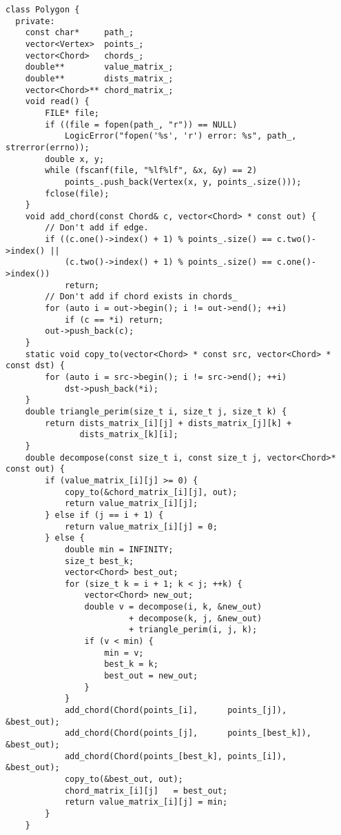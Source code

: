 \documentclass{article}%
\begin{document}
\begin{verbatim}
class Polygon {
  private:
    const char*     path_;
    vector<Vertex>  points_;
    vector<Chord>   chords_;
    double**        value_matrix_;
    double**        dists_matrix_;
    vector<Chord>** chord_matrix_;
    void read() {
        FILE* file;
        if ((file = fopen(path_, "r")) == NULL)
            LogicError("fopen('%s', 'r') error: %s", path_, strerror(errno));
        double x, y;
        while (fscanf(file, "%lf%lf", &x, &y) == 2)
            points_.push_back(Vertex(x, y, points_.size()));
        fclose(file);
    }
    void add_chord(const Chord& c, vector<Chord> * const out) {
        // Don't add if edge.
        if ((c.one()->index() + 1) % points_.size() == c.two()->index() ||
            (c.two()->index() + 1) % points_.size() == c.one()->index())
            return;
        // Don't add if chord exists in chords_
        for (auto i = out->begin(); i != out->end(); ++i)
            if (c == *i) return;
        out->push_back(c);
    }
    static void copy_to(vector<Chord> * const src, vector<Chord> * const dst) {
        for (auto i = src->begin(); i != src->end(); ++i)
            dst->push_back(*i);
    }
    double triangle_perim(size_t i, size_t j, size_t k) {
        return dists_matrix_[i][j] + dists_matrix_[j][k] +
               dists_matrix_[k][i];
    }
    double decompose(const size_t i, const size_t j, vector<Chord>* const out) {
        if (value_matrix_[i][j] >= 0) {
            copy_to(&chord_matrix_[i][j], out);
            return value_matrix_[i][j];
        } else if (j == i + 1) {
            return value_matrix_[i][j] = 0;
        } else {
            double min = INFINITY;
            size_t best_k;
            vector<Chord> best_out;
            for (size_t k = i + 1; k < j; ++k) {
                vector<Chord> new_out;
                double v = decompose(i, k, &new_out)
                         + decompose(k, j, &new_out)
                         + triangle_perim(i, j, k);
                if (v < min) {
                    min = v;
                    best_k = k;
                    best_out = new_out;
                }
            }
            add_chord(Chord(points_[i],      points_[j]),      &best_out);
            add_chord(Chord(points_[j],      points_[best_k]), &best_out);
            add_chord(Chord(points_[best_k], points_[i]),      &best_out);
            copy_to(&best_out, out);
            chord_matrix_[i][j]   = best_out;
            return value_matrix_[i][j] = min;
        }
    }


\end{verbatim}
\end{document}
